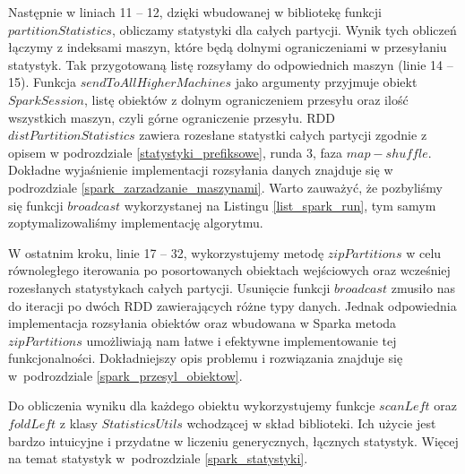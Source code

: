\documentclass[magisterska]{pracamgr}
\begin{document}
Następnie w liniach 11 -- 12, dzięki wbudowanej w bibliotekę funkcji \(partitionStatistics\), obliczamy statystyki dla całych partycji. Wynik tych obliczeń łączymy z indeksami maszyn, które będą dolnymi ograniczeniami w przesyłaniu statystyk. Tak przygotowaną listę rozsyłamy do odpowiednich maszyn (linie 14 -- 15). Funkcja \( sendToAllHigherMachines\) jako argumenty przyjmuje obiekt \(SparkSession\), listę obiektów z dolnym ograniczeniem przesyłu oraz ilość wszystkich maszyn, czyli górne ograniczenie przesyłu. RDD \(distPartitionStatistics\) zawiera rozesłane statystki całych partycji zgodnie z opisem w podrozdziale \ref{statystyki_prefiksowe}, runda 3, faza \(map-shuffle\). Dokładne wyjaśnienie implementacji rozsyłania danych znajduje się w podrozdziale \ref{spark_zarzadzanie_maszynami}. Warto zauważyć, że pozbyliśmy się funkcji \(broadcast\) wykorzystanej na Listingu \ref{list_spark_run}, tym samym zoptymalizowaliśmy implementację algorytmu.

W ostatnim kroku, linie 17 -- 32, wykorzystujemy metodę \(zipPartitions\) w celu równoległego iterowania po posortowanych obiektach wejściowych oraz wcześniej rozesłanych statystykach całych partycji. Usunięcie funkcji \(broadcast\) zmusiło nas do iteracji po dwóch RDD zawierających różne typy danych. Jednak odpowiednia implementacja rozsyłania obiektów oraz wbudowana w Sparka metoda \(zipPartitions\) umożliwiają nam łatwe i efektywne implementowanie tej funkcjonalności. Dokładniejszy opis problemu i rozwiązania znajduje się w~podrozdziale \ref{spark_przesyl_obiektow}.

Do obliczenia wyniku dla każdego obiektu wykorzystujemy funkcje \(scanLeft\) oraz \(foldLeft\) z klasy \(StatisticsUtils\) wchodzącej w skład biblioteki. Ich użycie jest bardzo intuicyjne i przydatne w liczeniu generycznych, łącznych statystyk. Więcej na temat statystyk w~podrozdziale \ref{spark_statystyki}.
\end{document}
